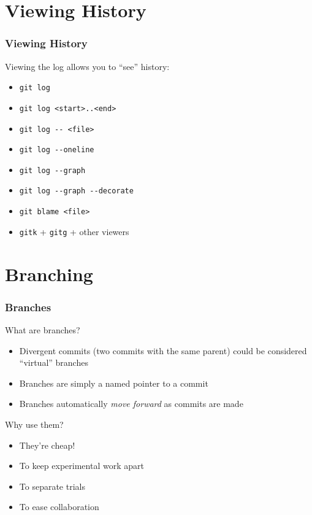 \documentclass{beamer}
\begin{document}
\section{Viewing History}

\begin{frame}
 \frametitle{Viewing History}

 Viewing the log allows you to ``see'' history:
 \begin{itemize}
  \item \texttt{git log}
  \pause
  \item \texttt{git log \alert{<start>..<end>}}
  \item \texttt{git log \alert{-{}- <file>}}
  \item \texttt{git log \alert{-{}-oneline}}
  \item \texttt{git log \alert{-{}-graph}}
  \item \texttt{git log -{}-graph \alert{-{}-decorate}} \\
 \end{itemize}
 \pause
 \begin{itemize}
  \item \texttt{git blame <file>}
 \end{itemize}
 \pause
 \begin{itemize}
  \item \texttt{gitk} + \texttt{gitg} + other viewers
 \end{itemize}
\end{frame}

\section{Branching}

\begin{frame}
 \frametitle{Branches}

 What are branches?
 \begin{itemize}[<+->]
  \item Divergent commits (two commits with the same parent) could be
        considered ``virtual'' branches
  \item Branches are simply a \alert{named pointer} to a commit
  \item Branches automatically \emph{move forward} as commits are made
 \end{itemize}
 \pause[\thebeamerpauses]
 Why use them?
 \pause
 \begin{itemize}[<+->]
  \item They're cheap!
  \item To keep experimental work apart
  \item To separate trials
  \item To ease collaboration
 \end{itemize}
\end{frame}
\end{document}
